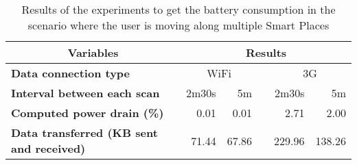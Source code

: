 \begin{table}[]
\centering
\begin{tabular}{@{}lrrlrr@{}}
\toprule
\multicolumn{1}{c}{\textbf{Variables}}           & \multicolumn{5}{c}{\textbf{Results}}                 \\ \midrule
\textbf{Data connection type}                    & \multicolumn{2}{c}{WiFi} &  & \multicolumn{2}{c}{3G} \\ \cmidrule(lr){2-3} \cmidrule(l){5-6}
\textbf{Interval between each scan}              & 2m30s       & 5m         &  & 2m30s      & 5m        \\
\textbf{Computed power drain (\%)}               & 0.01        & 0.01       &  & 2.71       & 2.00      \\
\textbf{Data transferred (KB sent and received)} & 71.44       & 67.86      &  & 229.96     & 138.26    \\ \bottomrule
\end{tabular}
\caption[Power drain when the user is moving]{Results of the experiments to get the battery consumption in the scenario where the user is moving along multiple Smart Places}
\label{tab:results_battery_walking}
\end{table}
